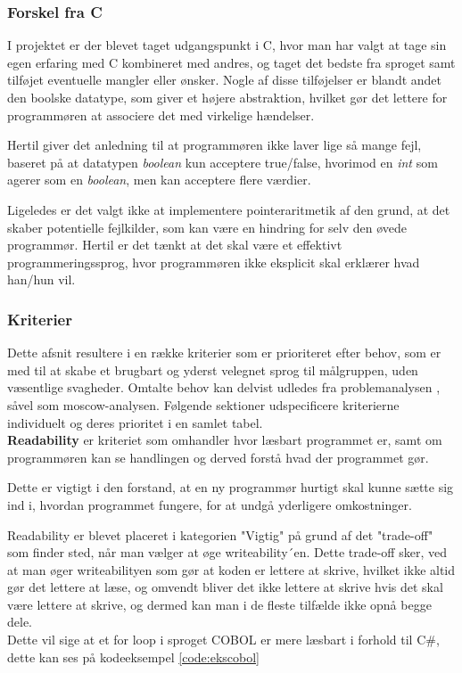 \subsubsection{Forskel fra C}
\label{sec:forskelfrac}
I projektet er der blevet taget udgangspunkt i C, hvor man har valgt at tage sin egen erfaring med C kombineret med andres, og taget det bedste fra sproget samt tilføjet eventuelle mangler eller ønsker.
Nogle af disse tilføjelser er blandt andet den boolske datatype, som giver et højere abstraktion, hvilket gør det  lettere for programmøren at associere det med virkelige hændelser.

Hertil giver det anledning til at programmøren ikke laver lige så mange fejl, baseret på at datatypen \textit{boolean} kun acceptere true/false, hvorimod en \textit{int} som agerer som en \textit{boolean}, men kan acceptere flere værdier.

Ligeledes er det valgt ikke at implementere pointeraritmetik af den grund, at det skaber potentielle fejlkilder, som kan være en hindring for selv den øvede programmør. Hertil er det tænkt at det skal være et effektivt programmeringssprog, hvor programmøren ikke eksplicit skal erklærer hvad han/hun vil.

\subsubsection{Kriterier}
Dette afsnit resultere i en række kriterier som er prioriteret efter behov, som er med til at skabe et brugbart og yderst velegnet sprog til målgruppen, uden væsentlige svagheder. Omtalte behov kan delvist udledes fra problemanalysen , såvel som \gls{moscow}-analysen.
Følgende sektioner udspecificere kriterierne individuelt og deres prioritet i en samlet tabel.\\

\noindent\textbf{Readability} er kriteriet som omhandler hvor læsbart programmet er, samt om programmøren kan se handlingen og derved forstå hvad der programmet gør.

Dette er vigtigt i den forstand, at en ny programmør hurtigt skal kunne sætte sig ind i, hvordan programmet fungere, for at undgå yderligere omkostninger. 

Readability er blevet placeret i kategorien "Vigtig" på grund af det "trade-off" som finder sted, når man vælger at øge writeability´en.
Dette trade-off sker, ved at man øger writeabilityen som gør at koden er lettere at skrive, hvilket ikke altid gør det lettere at læse, og omvendt bliver det ikke lettere at skrive hvis det skal være lettere at skrive, og dermed kan man i de fleste tilfælde ikke opnå begge dele.
\\
Dette vil sige at et for loop i sproget COBOL er mere læsbart i forhold til C\#, dette kan ses på kodeeksempel \ref{code:ekscobol}

